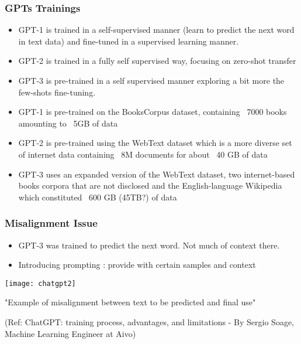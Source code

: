 \begin{frame}[fragile]\frametitle{GPTs Trainings}


\begin{itemize}
\item GPT-1 is trained in a self-supervised manner (learn to predict the next word in text data) and fine-tuned in a supervised learning manner. 
\item GPT-2 is trained in a fully self supervised way, focusing on zero-shot transfer
\item  GPT-3 is pre-trained in a self supervised manner exploring a bit more the few-shots fine-tuning.
\item GPT-1 is pre-trained on the BooksCorpus dataset, containing ~7000 books amounting to ~5GB of data
\item GPT-2 is pre-trained using the WebText dataset which is a more diverse set of internet data containing ~8M documents for about ~40 GB of data
\item GPT-3 uses an expanded version of the WebText dataset, two internet-based books corpora that are not disclosed and the English-language Wikipedia which constituted ~600 GB (45TB?) of data
\end{itemize}	 

\end{frame}



\begin{frame}[fragile]\frametitle{Misalignment Issue}


\begin{itemize}
\item GPT-3 was trained to predict the next word. Not much of context there.
\item Introducing prompting : provide with certain samples and context

\end{itemize}	 

			\begin{center}
			\texttt{[image: chatgpt2]}
			
			{\tiny "Example of misalignment between text to be predicted and final use"}
			\end{center}		
			
			
			{\tiny (Ref: ChatGPT: training process, advantages, and limitations - By Sergio Soage, Machine Learning Engineer at Aivo)}
			
\end{frame}

